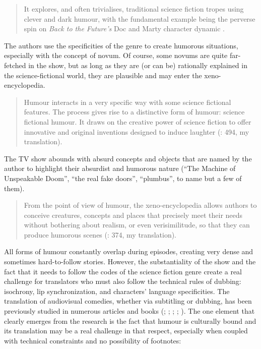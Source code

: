\documentclass[output=paper]{langscibook}
\begin{document}
\begin{quote}
It explores, and often trivialises, traditional science fiction tropes using clever and dark humour, with the fundamental example being the perverse spin on \textit{Back to the Future’s} Doc and Marty character dynamic \citep[101]{Koltun2018}.
\end{quote}

The authors use the specificities of the genre to create humorous situations, especially with the concept of novum. Of course, some novums are quite far-fetched in the show, but as long as they are (or can be) rationally explained in the science-fictional world, they are plausible and may enter the xeno-encyclopedia.

\begin{quote}
Humour interacts in a very specific way with some science fictional features. The process gives rise to a distinctive form of humour: science fictional humour. It draws on the creative power of science fiction to offer innovative and original inventions designed to induce laughter (\citealt{Dordain2014}: 494, my translation).
\end{quote}

The TV show abounds with absurd concepts and objects that are named by the author to highlight their absurdist and humorous nature (“The Machine of Unspeakable Doom”, “the real fake doors”, “plumbus”, to name but a few of them).

\begin{quote}
From the point of view of humour, the xeno-encyclopedia allows authors to conceive creatures, concepts and places that precisely meet their needs without bothering about realism, or even verisimilitude, so that they can produce humorous scenes (\citealt{Dordain2014}: 374, my translation).
\end{quote}

All forms of humour constantly overlap during episodes, creating very dense and sometimes hard-to-follow stories. However, the substantiality of the show and the fact that it needs to follow the codes of the science fiction genre create a real challenge for translators who must also follow the technical rules of dubbing: isochrony, lip synchronization, and characters’ language specificities. The translation of audiovisual comedies, whether via subtitling or dubbing, has been previously studied in numerous articles and books (\citealt{Zabalbeascoa1996}; \citealt{Attardo2002}; \citealt{Martínez-Sierra2006}; \citealt{Bucaria2008}; \citealt{Jankowska2009}). The one element that clearly emerges from the research is the fact that humour is culturally bound and its translation may be a real challenge in that respect, especially when coupled with technical constraints and no possibility of footnotes:
\end{document}
